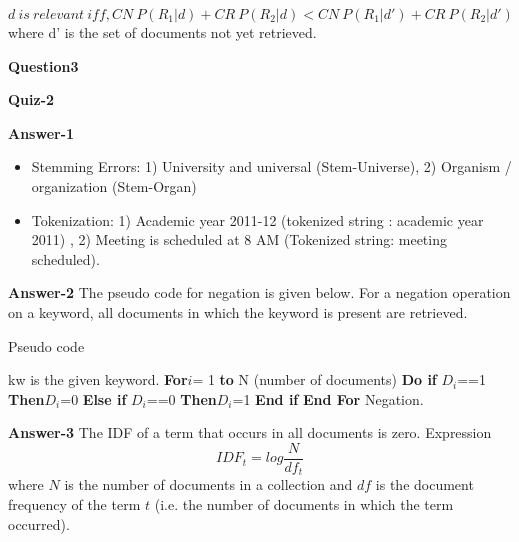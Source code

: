 \documentclass[10pt,onecolumn,letterpaper]{article}
\begin{document}
\begin{equation}
d ~is ~relevant ~iff, CN ~P(R_1|d)+ CR ~P(R_2|d) < CN ~P(R_1|d')+ CR ~P(R_2|d')
\end{equation}
\noindent where d' is the set of documents not yet retrieved.



\vspace{12pt}
\noindent\textbf{Question3}

\vspace{12pt}
\noindent\textbf{Quiz-2}

\vspace{12pt}

\noindent\textbf{Answer-1}
\begin{itemize}
\item Stemming Errors: 1) University and universal (Stem-Universe), 2) Organism / organization (Stem-Organ)
\item Tokenization: 1) Academic year 2011-12 (tokenized string : academic year 2011) , 2) Meeting is scheduled at 8 AM (Tokenized string: meeting scheduled).
\end{itemize}

\vspace{12pt}

\noindent\textbf{Answer-2} The pseudo code for negation is given below. For a negation operation on a keyword, all documents in which the keyword is present are retrieved.

\begin{algorithm}[]
   \caption{Pseudo code}
\begin{algorithmic}
    kw is the given keyword.
    {\bfseries For}$i$= 1 {\bfseries to} N (number of documents)
    {\bfseries Do if} $D_i$==1
    {\bfseries Then}$D_i$=0
    {\bfseries Else if} $D_i$==0
    {\bfseries Then}$D_i$=1
    {\bfseries End if}
    {\bfseries End For}
    Negation.
  \end{algorithmic}
\end{algorithm}

\vspace{12pt}

\noindent\textbf{Answer-3}
The IDF of a term that occurs in all documents is zero. Expression
\begin{equation}
IDF_t=log\frac{N}{df_t}
\end{equation}
\noindent where $N$ is the number of documents in a collection and $df$ is the document frequency of the term $t$ (i.e. the number of documents in which the term occurred).
\end{document}
